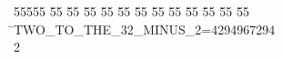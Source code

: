 %
%
\begin{tabbing}
55555 \= 55 \= 55 \= 55 \= 55 \= 55 \= 55 \= 55 \= 55 \= 55 \= 55 \= 55 \= 55 \= \>TWO\_TO\_THE\_32\_MINUS\_2=4294967294\\[0pt]
2\>\end{tabbing}
